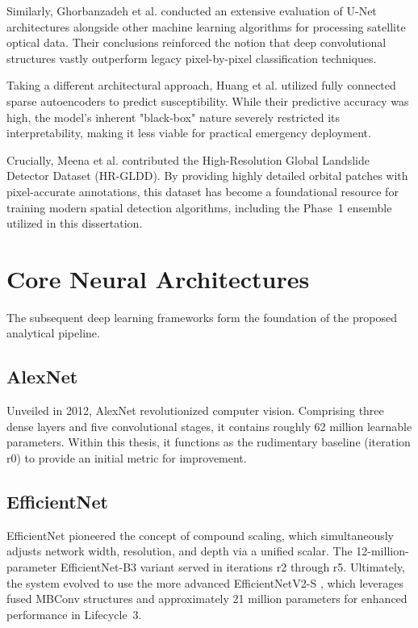 \documentclass[12pt,a4paper]{report}
\begin{document}
Similarly, Ghorbanzadeh et al. \cite{ghorbanzadeh2019unet} conducted an extensive evaluation of U-Net architectures alongside other machine learning algorithms for processing satellite optical data. Their conclusions reinforced the notion that deep convolutional structures vastly outperform legacy pixel-by-pixel classification techniques.

Taking a different architectural approach, Huang et al. \cite{huang2020landslide_dl} utilized fully connected sparse autoencoders to predict susceptibility. While their predictive accuracy was high, the model's inherent "black-box" nature severely restricted its interpretability, making it less viable for practical emergency deployment.

Crucially, Meena et al. \cite{meena2022hrgldd} contributed the High-Resolution Global Landslide Detector Dataset (HR-GLDD). By providing highly detailed orbital patches with pixel-accurate annotations, this dataset has become a foundational resource for training modern spatial detection algorithms, including the Phase~1 ensemble utilized in this dissertation.

\section{Core Neural Architectures}
The subsequent deep learning frameworks form the foundation of the proposed analytical pipeline.

\subsection{AlexNet}
Unveiled in 2012, AlexNet \cite{krizhevsky2012alexnet} revolutionized computer vision. Comprising three dense layers and five convolutional stages, it contains roughly 62 million learnable parameters. Within this thesis, it functions as the rudimentary baseline (iteration r0) to provide an initial metric for improvement.

\subsection{EfficientNet}
EfficientNet \cite{tan2019efficientnet} pioneered the concept of compound scaling, which simultaneously adjusts network width, resolution, and depth via a unified scalar. The 12-million-parameter EfficientNet-B3 variant served in iterations r2 through r5. Ultimately, the system evolved to use the more advanced EfficientNetV2-S \cite{tan2021efficientnetv2}, which leverages fused MBConv structures and approximately 21 million parameters for enhanced performance in Lifecycle~3.
\end{document}
